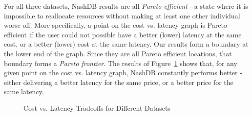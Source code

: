 \documentclass{brandiss}
\numberwithin{section}{chapter}
\numberwithin{figure}{chapter}
\theoremstyle{definition}
\theoremstyle{plain}
\theoremstyle{remark}
\begin{document}
For all three datasets, NashDB results are all \emph{Pareto efficient} - a state where it is impossible to reallocate resources without making at least one other individual worse off. More specifically, a point on the cost vs. latency graph is Pareto efficient if the user could not possible have a better (lower) latency at the same cost, or a better (lower) cost at the same latency. Our results form a boundary at the lower end of the graph. Since they are all Pareto efficient locations, that boundary forms a \emph{Pareto frontier}. The results of Figure~\ref{fig:pareto} shows that, for any given point on the cost vs. latency graph, NashDB constantly performs better - either delivering a better latency for the same price, or a better price for the same latency.


\begin{figure}[!tbp]
  \centering
  \hfill
  \hfill
  \caption{Cost vs. Latency Tradeoffs for Different Datasets}\label{fig:pareto}
\end{figure}


\backmatter
\singlespacing

\end{document}
